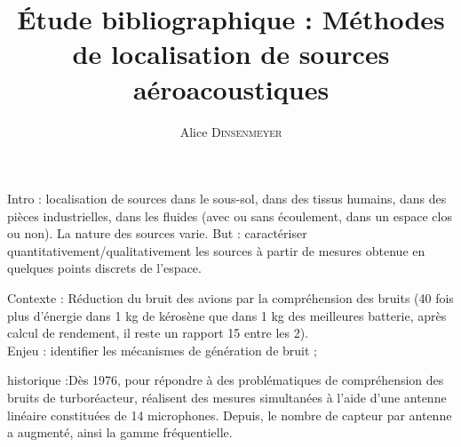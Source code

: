 \documentclass[twocolumn]{article}
\title{
\centering \fontsize{18pt}{10pt}\textbf{Étude bibliographique : Méthodes de localisation de sources aéroacoustiques}
}
\author{
\large{Alice \textsc{Dinsenmeyer}}\\[2mm] %
\vspace{-5mm}
}
\date{}
\begin{document}
\maketitle %

\thispagestyle{fancy} %




Intro : localisation de sources dans le sous-sol, dans des tissus humains, dans des pièces industrielles, dans les fluides (avec ou sans écoulement, dans un espace clos ou non). La nature des sources varie.
But : caractériser quantitativement/qualitativement les sources à partir de mesures obtenue en quelques points  discrets de l'espace.

Contexte : Réduction du bruit des avions par la compréhension des bruits (40 fois plus d'énergie dans 1 kg de kérosène que dans 1 kg des meilleures batterie, après calcul de rendement, il reste un rapport 15 entre les 2).\\
Enjeu : identifier les mécanismes de génération de bruit ; 

historique :Dès 1976, pour répondre à des problématiques de compréhension des bruits de turboréacteur, \cite{billingsley_1976} réalisent des mesures simultanées à l'aide d'une antenne linéaire constituées de 14 microphones. 
Depuis, le nombre de capteur par antenne a augmenté, ainsi la gamme fréquentielle.



\end{document}
